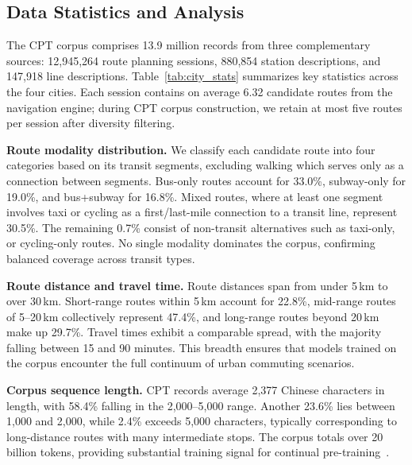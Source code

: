 \documentclass{article}
\begin{document}
\subsection{Data Statistics and Analysis}
\label{sec:stats}

The CPT corpus comprises 13.9 million records from three complementary sources: 12,945,264 route planning sessions, 880,854 station descriptions, and 147,918 line descriptions. Table~\ref{tab:city_stats} summarizes key statistics across the four cities. Each session contains on average 6.32 candidate routes from the navigation engine; during CPT corpus construction, we retain at most five routes per session after diversity filtering.

\textbf{Route modality distribution.}
We classify each candidate route into four categories based on its transit segments, excluding walking which serves only as a connection between segments. Bus-only routes account for 33.0\%, subway-only for 19.0\%, and bus+subway for 16.8\%. Mixed routes, where at least one segment involves taxi or cycling as a first/last-mile connection to a transit line, represent 30.5\%. The remaining 0.7\% consist of non-transit alternatives such as taxi-only, or cycling-only routes. No single modality dominates the corpus, confirming balanced coverage across transit types.

\textbf{Route distance and travel time.}
Route distances span from under 5\,km to over 30\,km. Short-range routes within 5\,km account for 22.8\%, mid-range routes of 5--20\,km collectively represent 47.4\%, and long-range routes beyond 20\,km make up 29.7\%. Travel times exhibit a comparable spread, with the majority falling between 15 and 90 minutes. This breadth ensures that models trained on the corpus encounter the full continuum of urban commuting scenarios.

\textbf{Corpus sequence length.}
CPT records average 2,377 Chinese characters in length, with 58.4\% falling in the 2,000--5,000 range. Another 23.6\% lies between 1,000 and 2,000, while 2.4\% exceeds 5,000 characters, typically corresponding to long-distance routes with many intermediate stops. The corpus totals over 20 billion tokens, providing substantial training signal for continual pre-training~\cite{hoffmann2022training}.
\end{document}
